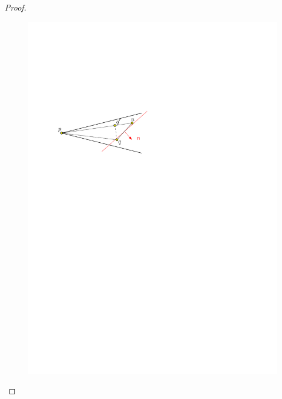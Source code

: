 \documentclass[12pt]{article}%
\begin{document}
\begin{proof}
    \begin{figure}[h]
        \centering%
        \includegraphics[page=2]{figs/triangle_cone_edge}
        \caption{}%
    \end{figure}


\end{proof}
\end{document}

